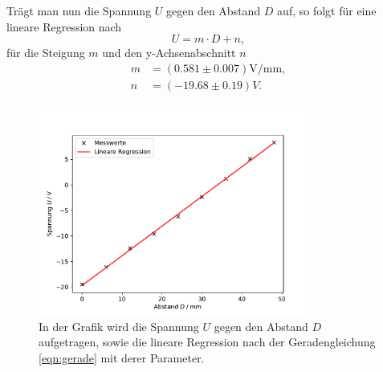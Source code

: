     Trägt man nun die Spannung $U$ gegen den Abstand $D$ auf, so folgt für eine lineare 
    Regression nach 
    \begin{equation}
        U=m\cdot D + n,
        \label{eqn:gerade}
    \end{equation}
    für die Steigung $m$ und den y-Achsenabschnitt $n$
    \begin{align*}
        m&=(0.581\pm0.007) \si{\volt\per\mm},\\
        n&=(-19.68\pm0.19) \si{V}.\\
    \end{align*}
    \begin{figure}[H]
        \centering
        \includegraphics[width=0.8\textwidth]{plot.pdf}
        \caption{In der Grafik wird die Spannung $U$ gegen den Abstand $D$ aufgetragen, sowie 
        die lineare Regression nach der Geradengleichung \ref{eqn:gerade} mit derer Parameter.}
    \end{figure}